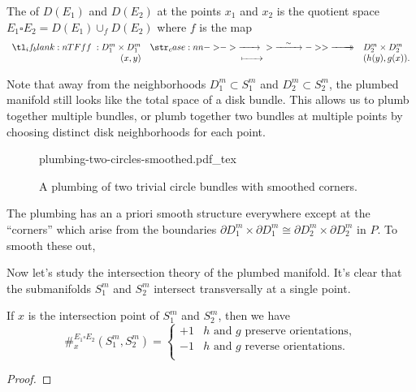 \begin{definition}\label{def:plumbing}
The  of $D(E_1)$ and $D(E_2)$ at the points $x_1$ and $x_2$ is the quotient space $E_1\square E_2 =D(E_1)\cup_f D(E_2)$ where $f$ is the map
\[
		\lkxfunc{f}{D_1^m\times D_1^m}{D_2^m\times D_2^m}{(x,y)}{(h(y), g(x)).}
\]
\end{definition}

Note that away from the neighborhoods $D_1^m\subset S^m_1$ and $D_2^m\subset S^m_2$, the plumbed manifold still looks like the total space of a disk bundle. This allows us to plumb together multiple bundles, or plumb together two bundles at multiple points by choosing distinct disk neighborhoods for each point.

\begin{figure}[ht]
	\centering
	{plumbing-two-circles-smoothed.pdf_tex}
	\caption{A plumbing of two trivial circle bundles with smoothed corners.}\label{fig:plumbing-two-circles}
\end{figure}

\begin{remark}\label{rmk:smoothing-corners}
	The plumbing has an a priori smooth structure everywhere except at the ``corners'' which arise from the boundaries $\partial D_1^m\times \partial D_1^m \cong \partial D_2^m\times \partial D_2^m$ in $P$. To smooth these out, 
\end{remark}

Now let's study the intersection theory of the plumbed manifold. It's clear that the submanifolds $S_1^m$ and $S_2^m$ intersect transversally at a single point.

\begin{proposition}
	If $x$ is the intersection point of $S_1^m$ and $S_2^m$, then we have
	\[
		\#^{E_1\square E_2}_{x}(S_1^m, S_2^m) = \begin{cases}
		+1 & h \textrm{ and }g\textrm{ preserve orientations},\\
		-1 & h \textrm{ and }g\textrm{ reverse orientations}.\\
	\end{cases}
	\]
\end{proposition}
\begin{proof}
\end{proof}

